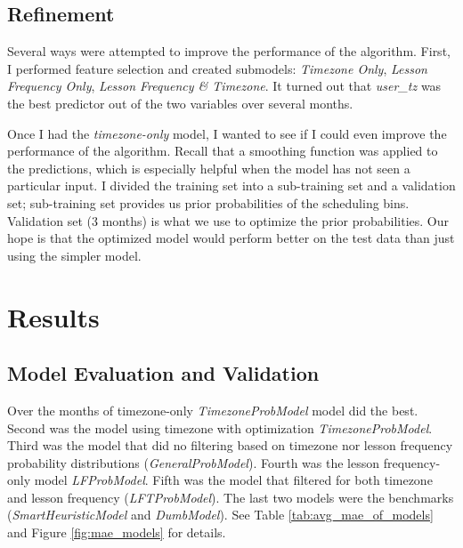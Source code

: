 \documentclass[oneside]{article}
\begin{document}
\subsection{Refinement}

Several ways were attempted to improve the performance of the algorithm.
First, I performed feature selection and created submodels: \emph{Timezone
Only}, \emph{Lesson Frequency Only}, \emph{Lesson Frequency \& Timezone}. It
turned out that \emph{user\_tz} was the best predictor out of the two variables
over several months.

Once I had the \emph{timezone-only} model, I wanted to see if I could even
improve the performance of the algorithm. Recall that a smoothing function was
applied to the predictions, which is especially helpful when the model has not
seen a particular input. I divided the training set into a sub-training set and
a validation set; sub-training set provides us prior probabilities of the
scheduling bins. Validation set (3 months) is what we use to optimize the prior
probabilities. Our hope is that the optimized model would perform better on the
test data than just using the simpler model.

\section{Results}

\subsection{Model Evaluation and Validation}

Over the months of timezone-only \emph{TimezoneProbModel} model did the best.
Second was the model using timezone with optimization \emph{TimezoneProbModel}.
Third was the model that did no filtering based on timezone nor lesson
frequency probability distributions (\emph{GeneralProbModel}). Fourth was  the
lesson frequency-only model \emph{LFProbModel}.  Fifth was the model that
filtered for both timezone and lesson frequency (\emph{LFTProbModel}). The last
two models were the benchmarks (\emph{SmartHeuristicModel} and
\emph{DumbModel}). See Table \ref{tab:avg_mae_of_models} and Figure
\ref{fig:mae_models} for details.
\end{document}
